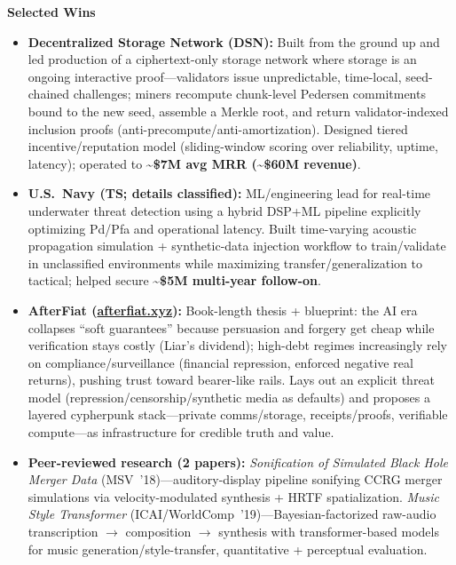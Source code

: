 \documentclass[10.5pt]{res}
\begin{document}
\begin{resume}
{\bf Selected Wins} \\
\begin{itemize}
    \item \textbf{Decentralized Storage Network (DSN):} Built from the ground up and led production of a ciphertext-only storage network where storage is an ongoing interactive proof---validators issue unpredictable, time-local, seed-chained challenges; miners recompute chunk-level Pedersen commitments bound to the new seed, assemble a Merkle root, and return validator-indexed inclusion proofs (anti-precompute/anti-amortization). Designed tiered incentive/reputation model (sliding-window scoring over reliability, uptime, latency); operated to \textbf{\textasciitilde\$7M avg MRR (\textasciitilde\$60M revenue)}.
    \item \textbf{U.S.\ Navy (TS; details classified):} ML/engineering lead for real-time underwater threat detection using a hybrid DSP+ML pipeline explicitly optimizing Pd/Pfa and operational latency. Built time-varying acoustic propagation simulation + synthetic-data injection workflow to train/validate in unclassified environments while maximizing transfer/generalization to tactical; helped secure \textbf{\textasciitilde\$5M multi-year follow-on}.
    \item \textbf{AfterFiat (\href{https://afterfiat.xyz}{afterfiat.xyz}):} Book-length thesis + blueprint: the AI era collapses ``soft guarantees'' because persuasion and forgery get cheap while verification stays costly (Liar's dividend); high-debt regimes increasingly rely on compliance/surveillance (financial repression, enforced negative real returns), pushing trust toward bearer-like rails. Lays out an explicit threat model (repression/censorship/synthetic media as defaults) and proposes a layered cypherpunk stack---private comms/storage, receipts/proofs, verifiable compute---as infrastructure for credible truth and value.
    \item \textbf{Peer-reviewed research (2 papers):} \textit{Sonification of Simulated Black Hole Merger Data} (MSV~'18)---auditory-display pipeline sonifying CCRG merger simulations via velocity-modulated synthesis + HRTF spatialization. \textit{Music Style Transformer} (ICAI/WorldComp~'19)---Bayesian-factorized raw-audio transcription $\rightarrow$ composition $\rightarrow$ synthesis with transformer-based models for music generation/style-transfer, quantitative + perceptual evaluation.
\end{itemize}


\end{resume}
\end{document}

